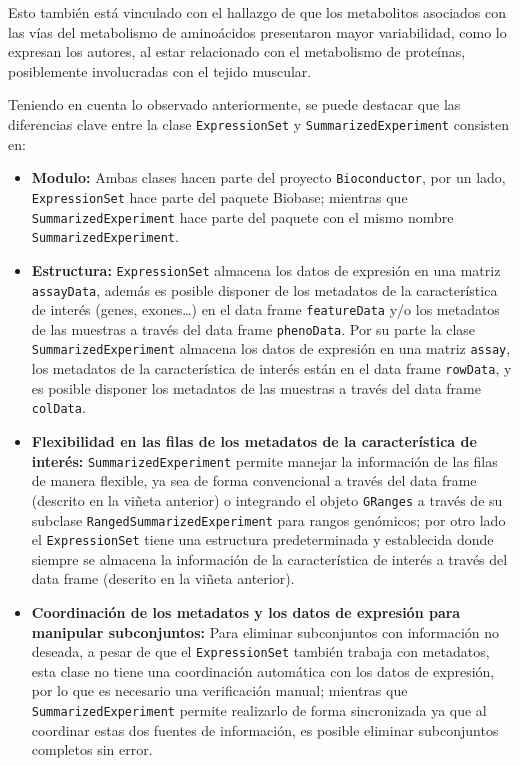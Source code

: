 \documentclass[
]{article}
\begin{document}
Esto también está vinculado con el hallazgo de que los metabolitos
asociados con las vías del metabolismo de aminoácidos presentaron mayor
variabilidad, como lo expresan los autores, al estar relacionado con el
metabolismo de proteínas, posiblemente involucradas con el tejido
muscular.

Teniendo en cuenta lo observado anteriormente, se puede destacar que las
diferencias clave entre la clase \texttt{ExpressionSet} y
\texttt{SummarizedExperiment} consisten en:

\begin{itemize}
\item
  \textbf{Modulo:} Ambas clases hacen parte del proyecto
  \texttt{Bioconductor}, por un lado, \texttt{ExpressionSet} hace parte
  del paquete Biobase; mientras que \texttt{SummarizedExperiment} hace
  parte del paquete con el mismo nombre \texttt{SummarizedExperiment}.
\item
  \textbf{Estructura:} \texttt{ExpressionSet} almacena los datos de
  expresión en una matriz \texttt{assayData}, además es posible disponer
  de los metadatos de la característica de interés (genes, exones\ldots)
  en el data frame \texttt{featureData} y/o los metadatos de las
  muestras a través del data frame \texttt{phenoData}. Por su parte la
  clase \texttt{SummarizedExperiment} almacena los datos de expresión en
  una matriz \texttt{assay}, los metadatos de la característica de
  interés están en el data frame \texttt{rowData}, y es posible disponer
  los metadatos de las muestras a través del data frame
  \texttt{colData}.
\item
  \textbf{Flexibilidad en las filas de los metadatos de la
  característica de interés:} \texttt{SummarizedExperiment} permite
  manejar la información de las filas de manera flexible, ya sea de
  forma convencional a través del data frame (descrito en la viñeta
  anterior) o integrando el objeto \texttt{GRanges} a través de su
  subclase \texttt{RangedSummarizedExperiment} para rangos genómicos;
  por otro lado el \texttt{ExpressionSet} tiene una estructura
  predeterminada y establecida donde siempre se almacena la información
  de la característica de interés a través del data frame (descrito en
  la viñeta anterior).
\item
  \textbf{Coordinación de los metadatos y los datos de expresión para
  manipular subconjuntos:} Para eliminar subconjuntos con información no
  deseada, a pesar de que el \texttt{ExpressionSet} también trabaja con
  metadatos, esta clase no tiene una coordinación automática con los
  datos de expresión, por lo que es necesario una verificación manual;
  mientras que \texttt{SummarizedExperiment} permite realizarlo de forma
  sincronizada ya que al coordinar estas dos fuentes de información, es
  posible eliminar subconjuntos completos sin error.
\end{itemize}
\end{document}
